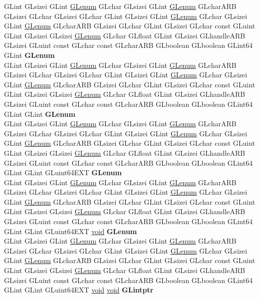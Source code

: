 \begin{DoxyCompactItemize}
\begin{tabbing}
\>GLint GLsizei GLint \hyperlink{interfacevoid}{GLenum} GLchar GLsizei GLint \hyperlink{interfacevoid}{GLenum} GLcharARB GLsizei GLchar GLsizei GLchar GLint GLsizei GLint \hyperlink{interfacevoid}{GLenum} GLchar GLsizei GLint \hyperlink{interfacevoid}{GLenum} GLcharARB GLsizei GLchar GLint GLsizei GLchar const GLuint GLint GLsizei GLsizei \hyperlink{interfacevoid}{GLenum} GLchar GLfloat GLint GLsizei GLhandleARB GLsizei GLuint const GLchar const GLcharARB GLboolean GLboolean GLint64 GLint {\bfseries GLenum}\\
\>GLint GLsizei GLint \hyperlink{interfacevoid}{GLenum} GLchar GLsizei GLint \hyperlink{interfacevoid}{GLenum} GLcharARB GLsizei GLchar GLsizei GLchar GLint GLsizei GLint \hyperlink{interfacevoid}{GLenum} GLchar GLsizei GLint \hyperlink{interfacevoid}{GLenum} GLcharARB GLsizei GLchar GLint GLsizei GLchar const GLuint GLint GLsizei GLsizei \hyperlink{interfacevoid}{GLenum} GLchar GLfloat GLint GLsizei GLhandleARB GLsizei GLuint const GLchar const GLcharARB GLboolean GLboolean GLint64 GLint GLint {\bfseries GLenum}\\
\>GLint GLsizei GLint \hyperlink{interfacevoid}{GLenum} GLchar GLsizei GLint \hyperlink{interfacevoid}{GLenum} GLcharARB GLsizei GLchar GLsizei GLchar GLint GLsizei GLint \hyperlink{interfacevoid}{GLenum} GLchar GLsizei GLint \hyperlink{interfacevoid}{GLenum} GLcharARB GLsizei GLchar GLint GLsizei GLchar const GLuint GLint GLsizei GLsizei \hyperlink{interfacevoid}{GLenum} GLchar GLfloat GLint GLsizei GLhandleARB GLsizei GLuint const GLchar const GLcharARB GLboolean GLboolean GLint64 GLint GLint GLuint64EXT {\bfseries GLenum}\\
\>GLint GLsizei GLint \hyperlink{interfacevoid}{GLenum} GLchar GLsizei GLint \hyperlink{interfacevoid}{GLenum} GLcharARB GLsizei GLchar GLsizei GLchar GLint GLsizei GLint \hyperlink{interfacevoid}{GLenum} GLchar GLsizei GLint \hyperlink{interfacevoid}{GLenum} GLcharARB GLsizei GLchar GLint GLsizei GLchar const GLuint GLint GLsizei GLsizei \hyperlink{interfacevoid}{GLenum} GLchar GLfloat GLint GLsizei GLhandleARB GLsizei GLuint const GLchar const GLcharARB GLboolean GLboolean GLint64 GLint GLint GLuint64EXT \hyperlink{interfacevoid}{void} {\bfseries GLenum}\\
\>GLint GLsizei GLint \hyperlink{interfacevoid}{GLenum} GLchar GLsizei GLint \hyperlink{interfacevoid}{GLenum} GLcharARB GLsizei GLchar GLsizei GLchar GLint GLsizei GLint \hyperlink{interfacevoid}{GLenum} GLchar GLsizei GLint \hyperlink{interfacevoid}{GLenum} GLcharARB GLsizei GLchar GLint GLsizei GLchar const GLuint GLint GLsizei GLsizei \hyperlink{interfacevoid}{GLenum} GLchar GLfloat GLint GLsizei GLhandleARB GLsizei GLuint const GLchar const GLcharARB GLboolean GLboolean GLint64 GLint GLint GLuint64EXT \hyperlink{interfacevoid}{void} \hyperlink{interfacevoid}{void} {\bfseries GLintptr}\\

\end{tabbing}
\end{DoxyCompactItemize}
